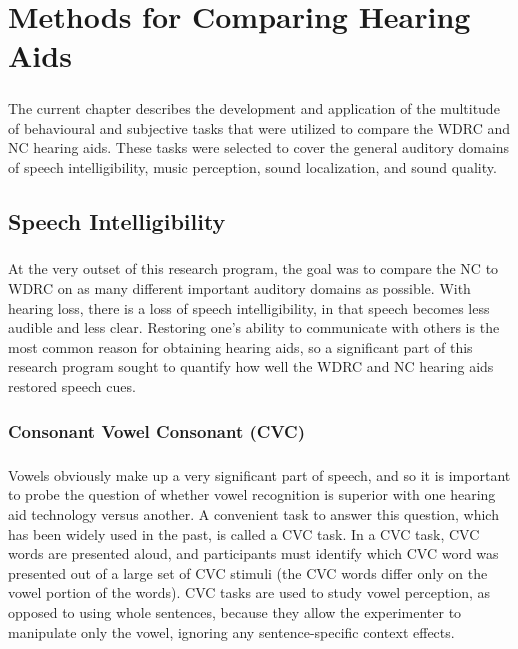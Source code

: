 \chapter{Methods for Comparing Hearing Aids}
\paragraph{}The current chapter describes the development and application of the multitude of behavioural and subjective tasks that were utilized to compare the WDRC and NC hearing aids.  These tasks were selected to cover the general auditory domains of speech intelligibility, music perception, sound localization, and sound quality.

\section{Speech Intelligibility}
\paragraph{}At the very outset of this research program, the goal was to compare the NC to WDRC on as many different important auditory domains as possible.  With hearing loss, there is a loss of speech intelligibility, in that speech becomes less audible and less clear.  Restoring one's ability to communicate with others is the most common reason for obtaining hearing aids, so a significant part of this research program sought to quantify how well the WDRC and NC hearing aids restored speech cues.

\subsection{Consonant Vowel Consonant (CVC)}
\paragraph{}Vowels obviously make up a very significant part of speech, and so it is important to probe the question of whether vowel recognition is superior with one hearing aid technology versus another.  A convenient task to answer this question, which has been widely used in the past, is called a CVC task.  In a CVC task, CVC words are presented aloud, and participants must identify which CVC word was presented out of a large set of CVC stimuli (the CVC words differ only on the vowel portion of the words).  CVC tasks are used to study vowel perception, as opposed to using whole sentences, because they allow the experimenter to manipulate only the vowel, ignoring any sentence-specific context effects.

